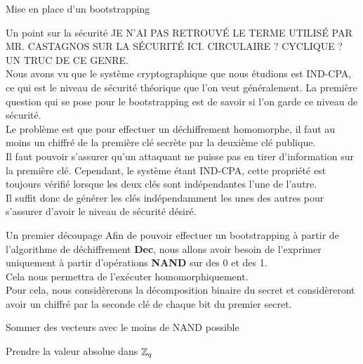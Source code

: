 \begin{section}{Mise en place d'un bootstrapping}
\begin{subsection}{Un point sur la sécurité}
JE N'AI PAS RETROUVÉ LE TERME UTILISÉ PAR MR. CASTAGNOS SUR LA SÉCURITÉ ICI.
CIRCULAIRE ? CYCLIQUE ? UN TRUC DE CE GENRE.\\
Nous avons vu que le système cryptographique que nous étudions est IND-CPA, ce qui est le niveau de sécurité théorique que l'on veut généralement. La première question qui se pose pour le bootstrapping est de savoir si l'on garde ce niveau de sécurité.\\
Le problème est que pour effectuer un déchiffrement homomorphe, il faut au moins un chiffré de la première clé secrète par la deuxième clé publique. \\
Il faut pouvoir s'assurer qu'un attaquant ne puisse pas en tirer d'information sur la première clé. Cependant, le système étant IND-CPA, cette propriété est toujours vérifié lorsque les deux clés sont indépendantes l'une de l'autre. \\
Il suffit donc de générer les clés indépendamment les unes des autres pour s'assurer d'avoir le niveau de sécurité désiré.
\end{subsection}
\begin{subsection}{Un premier découpage}
Afin de pouvoir effectuer un bootstrapping à partir de l'algorithme de déchiffrement \textbf{Dec}, nous allons avoir besoin de l'exprimer uniquement à partir d'opérations \textbf{NAND} sur des 0 et des 1. \\
Cela nous permettra de l'exécuter homomorphiquement. \\
Pour cela, nous considèrerons la décomposition binaire du secret et considèreront avoir un chiffré par la seconde clé de chaque bit du premier secret.
\end{subsection}
\begin{subsection}{Sommer des vecteurs avec le moins de NAND possible}
\end{subsection}
\begin{subsection}{Prendre la valeur absolue dans $\mathbb{Z}_q$}
\end{subsection}
\end{section}
